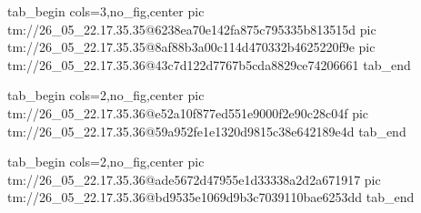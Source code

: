  
 
 
 
 

\qqSecCmtScr


\ifcmt
  tab_begin cols=3,no_fig,center
    pic tm://26_05_22.17.35.35@6238ea70e142fa875c795335b813515d
    pic tm://26_05_22.17.35.35@8af88b3a00c114d470332b4625220f9e
    pic tm://26_05_22.17.35.36@43c7d122d7767b5cda8829ce74206661
  tab_end
\fi


\ifcmt
  tab_begin cols=2,no_fig,center
    pic tm://26_05_22.17.35.36@e52a10f877ed551e9000f2e90c28c04f
    pic tm://26_05_22.17.35.36@59a952fe1e1320d9815c38e642189e4d
  tab_end
\fi


\ifcmt
  tab_begin cols=2,no_fig,center
    pic tm://26_05_22.17.35.36@ade5672d47955e1d33338a2d2a671917
    pic tm://26_05_22.17.35.36@bd9535e1069d9b3c7039110bae6253dd
  tab_end
\fi

